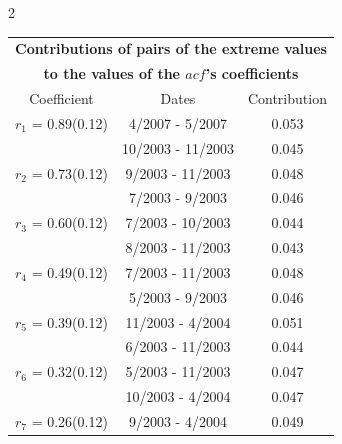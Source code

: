 
\thispagestyle{empty}
\begin{multicols}{2}{ 
\begin{tabular}{ccc}
\multicolumn{3}{c}{\textbf{Contributions of pairs of the extreme values} }  \vspace{-.10in}  \\ 
\multicolumn{3}{c}{ \textbf{to the values of the $acf$'s coefficients}} \\ 
\hline 
\hline                  Coefficient  &  Dates &  Contribution \\ 
\hline 
  $r_{ 1}$ = 0.89(0.12) &       4/2007 -  5/2007 &        0.053   \vspace{-.10in} \\  
&       10/2003 - 11/2003 &        0.045  \vspace{-.02in} \\ \hline 
  $r_{ 2}$ = 0.73(0.12) &       9/2003 - 11/2003 &        0.048   \vspace{-.10in} \\  
&        7/2003 -  9/2003 &        0.046  \vspace{-.02in} \\ \hline 
  $r_{ 3}$ = 0.60(0.12) &       7/2003 - 10/2003 &        0.044   \vspace{-.10in} \\  
&        8/2003 - 11/2003 &        0.043  \vspace{-.02in} \\ \hline 
  $r_{ 4}$ = 0.49(0.12) &       7/2003 - 11/2003 &        0.048   \vspace{-.10in} \\  
&        5/2003 -  9/2003 &        0.046  \vspace{-.02in} \\ \hline 
  $r_{ 5}$ = 0.39(0.12) &      11/2003 -  4/2004 &        0.051   \vspace{-.10in} \\  
&        6/2003 - 11/2003 &        0.044  \vspace{-.02in} \\ \hline 
  $r_{ 6}$ = 0.32(0.12) &       5/2003 - 11/2003 &        0.047   \vspace{-.10in} \\  
&       10/2003 -  4/2004 &        0.047  \vspace{-.02in} \\ \hline 
  $r_{ 7}$ = 0.26(0.12) &       9/2003 -  4/2004 &        0.049   \vspace{-.10in} \\  

\end{tabular}}
\end{multicols}
